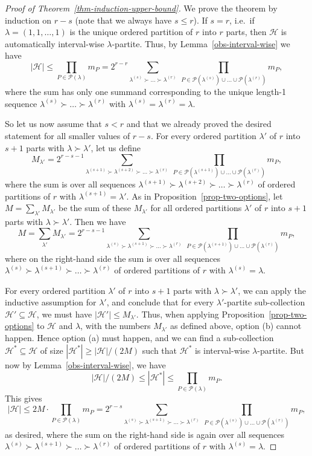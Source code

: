 \documentclass[10pt,a4paper]{amsart}
\newcommand{\HH}{\mathcal{H}}
\newcommand{\PP}{\mathcal{P}}
\newcommand{\su}{\subseteq}
\begin{document}
\begin{proof}[Proof of Theorem~\ref{thm-induction-upper-bound}]
    We prove the theorem by induction on $r-s$ (note that we always have $s\le r$). If $s=r$, i.e.\ if $\lambda=(1,1,\dots,1)$ is the unique ordered partition of $r$ into $r$ parts, then $\HH$ is automatically interval-wise $\lambda$-partite. Thus, by Lemma~\ref{obs-interval-wise} we have
    \[|\HH|\le \prod_{P\in \PP(\lambda)} m_{P}=2^{r-r} \sum_{\lambda^{(s)} \succ \dots \succ \lambda^{(r)}}\  \prod_{P\in \PP(\lambda^{(s)})\cup\dots\cup \PP(\lambda^{(r)})} m_{P},\]
    where the sum has only one summand corresponding to the unique length-1 sequence $\lambda^{(s)} \succ \dots \succ \lambda^{(r)}$ with $\lambda^{(s)}=\lambda^{(r)}=\lambda$.

    So let us now assume that $s<r$ and that we already proved the desired statement for all smaller values of $r-s$.  For every ordered partition $\lambda'$ of $r$ into $s+1$ parts with $\lambda\succ\lambda'$, let us define
    \[M_{\lambda'}=2^{r-s-1} \sum_{\lambda^{(s+1)} \succ \lambda^{(s+2)} \succ \dots \succ \lambda^{(r)}}\ \prod_{P\in \PP(\lambda^{(s+1)})\cup\dots\cup \PP(\lambda^{(r)})} m_{P},\]
    where the sum is over all sequences $\lambda^{(s+1)} \succ \lambda^{(s+2)} \succ \dots \succ \lambda^{(r)}$ of ordered partitions of $r$ with $\lambda^{(s+1)}=\lambda'$. As in Proposition~\ref{prop-two-options}, let $M=\sum_{\lambda'}M_{\lambda'}$ be the sum of these $M_{\lambda'}$ for all ordered partitions $\lambda'$ of $r$ into $s+1$ parts with $\lambda\succ\lambda'$. Then we have
    \[M=\sum_{\lambda'} M_{\lambda'}=2^{r-s-1} \sum_{\lambda^{(s)}\succ \lambda^{(s+1)}\succ \dots \succ \lambda^{(r)}}\ \prod_{ P\in \PP(\lambda^{(s+1)})\cup\dots\cup \PP(\lambda^{(r)}) } m_{P},\]
    where on the right-hand side the sum is over all sequences $\lambda^{(s)} \succ \lambda^{(s+1)} \succ \dots \succ \lambda^{(r)}$ of ordered partitions of $r$ with $\lambda^{(s)}=\lambda$.

    For every ordered partition $\lambda'$ of $r$ into $s+1$ parts with $\lambda\succ\lambda'$, we can apply the inductive assumption for $\lambda'$, and conclude that for every $\lambda'$-partite sub-collection $\HH'\su \HH$, we must have $|\HH'|\le M_{\lambda'}$. Thus, when applying Proposition~\ref{prop-two-options} to $\HH$ and $\lambda$, with the numbers $M_{\lambda'}$ as defined above, option (b) cannot happen. Hence option (a) must happen, and we can find a sub-collection $\HH^*\su \HH$ of size $|\HH^*|\ge |\HH|/(2M)$ such that $\HH^*$ is interval-wise $\lambda$-partite. But now by Lemma~\ref{obs-interval-wise}, we have
    \[|\HH|/(2M)\le |\HH^*|\le \prod_{P\in \PP(\lambda)} m_{P}.\]
    This gives
    \[|\HH|\le 2M\cdot \prod_{P\in \PP(\lambda)} m_{P}=2^{r-s} \sum_{\lambda^{(s)} \succ \lambda^{(s+1)} \succ \dots \succ \lambda^{(r)}}\ \prod_{ P\in \PP(\lambda^{(s)})\cup\dots\cup \PP(\lambda^{(r)}) } m_{P},\]
    as desired, where the sum on the right-hand side is again over all sequences $\lambda^{(s)} \succ \lambda^{(s+1)} \succ \dots \succ \lambda^{(r)}$ of ordered partitions of $r$ with $\lambda^{(s)}=\lambda$.
    \end{proof}
\end{document}
